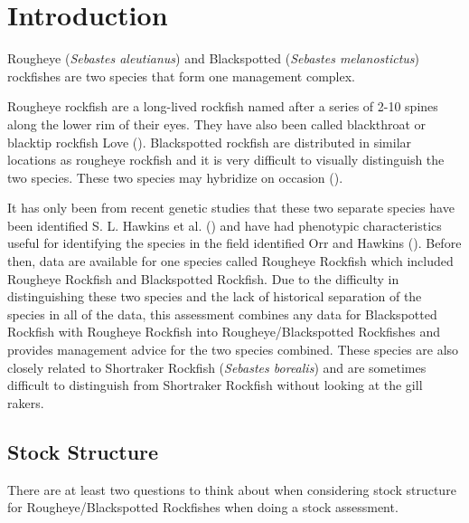 \documentclass[
]{scrartcl}
\begin{document}
\newpage{}

\setlength{\parskip}{5mm plus1mm minus1mm}
\setcounter{page}{1}
\setcounter{section}{0}
\renewcommand{\thefigure}{\arabic{figure}}
\renewcommand{\thetable}{\arabic{table}}

\section{Introduction}\label{introduction}

Rougheye (\emph{Sebastes aleutianus}) and Blackspotted (\emph{Sebastes
melanostictus}) rockfishes are two species that form one management
complex.

Rougheye rockfish are a long-lived rockfish named after a series of 2-10
spines along the lower rim of their eyes. They have also been called
blackthroat or blacktip rockfish Love
(). Blackspotted rockfish are
distributed in similar locations as rougheye rockfish and it is very
difficult to visually distinguish the two species. These two species may
hybridize on occasion ().

It has only been from recent genetic studies that these two separate
species have been identified S. L. Hawkins et al.
() and have had phenotypic
characteristics useful for identifying the species in the field
identified Orr and Hawkins ().
Before then, data are available for one species called Rougheye Rockfish
which included Rougheye Rockfish and Blackspotted Rockfish. Due to the
difficulty in distinguishing these two species and the lack of
historical separation of the species in all of the data, this assessment
combines any data for Blackspotted Rockfish with Rougheye Rockfish into
Rougheye/Blackspotted Rockfishes and provides management advice for the
two species combined. These species are also closely related to
Shortraker Rockfish (\emph{Sebastes borealis}) and are sometimes
difficult to distinguish from Shortraker Rockfish without looking at the
gill rakers.

\subsection{Stock Structure}\label{stock-structure}

There are at least two questions to think about when considering stock
structure for Rougheye/Blackspotted Rockfishes when doing a stock
assessment.
\end{document}

